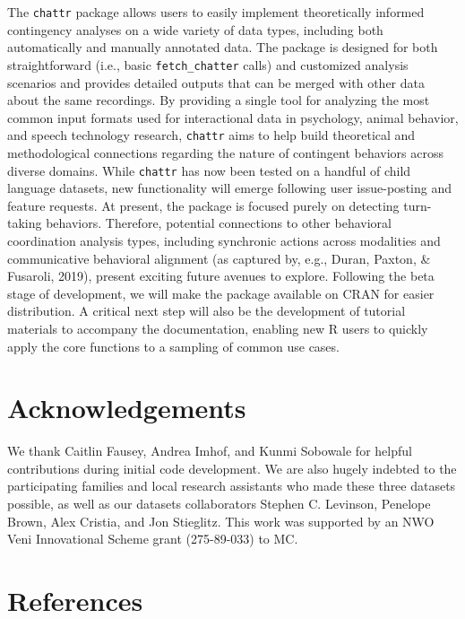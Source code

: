 \documentclass[10pt, letterpaper]{article}
\begin{document}
The \texttt{chattr} package allows users to easily implement
theoretically informed contingency analyses on a wide variety of data
types, including both automatically and manually annotated data. The
package is designed for both straightforward (i.e., basic
\texttt{fetch\_chatter} calls) and customized analysis scenarios and
provides detailed outputs that can be merged with other data about the
same recordings. By providing a single tool for analyzing the most
common input formats used for interactional data in psychology, animal
behavior, and speech technology research, \texttt{chattr} aims to help
build theoretical and methodological connections regarding the nature of
contingent behaviors across diverse domains. While \texttt{chattr} has
now been tested on a handful of child language datasets, new
functionality will emerge following user issue-posting and feature
requests. At present, the package is focused purely on detecting
turn-taking behaviors. Therefore, potential connections to other
behavioral coordination analysis types, including synchronic actions
across modalities and communicative behavioral alignment (as captured
by, e.g., Duran, Paxton, \& Fusaroli, 2019), present exciting future
avenues to explore. Following the beta stage of development, we will
make the package available on CRAN for easier distribution. A critical
next step will also be the development of tutorial materials to
accompany the documentation, enabling new R users to quickly apply the
core functions to a sampling of common use cases.

\hypertarget{acknowledgements}{%
\section{Acknowledgements}\label{acknowledgements}}

We thank Caitlin Fausey, Andrea Imhof, and Kunmi Sobowale for helpful
contributions during initial code development. We are also hugely
indebted to the participating families and local research assistants who
made these three datasets possible, as well as our datasets
collaborators Stephen C. Levinson, Penelope Brown, Alex Cristia, and Jon
Stieglitz. This work was supported by an NWO Veni Innovational Scheme
grant (275-89-033) to MC.

\newpage

\hypertarget{references}{%
\section{References}\label{references}}
\end{document}

